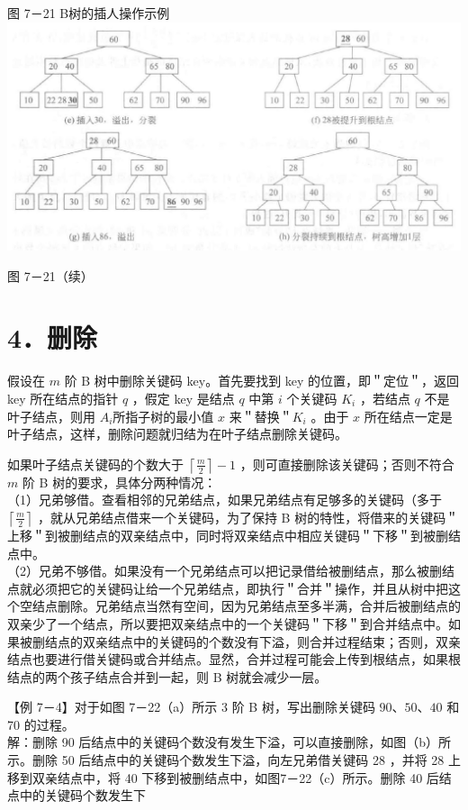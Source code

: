 \documentclass[10pt]{article}
\begin{document}
图 7－21 B树的插人操作示例\\
\includegraphics[max width=\textwidth, center]{2025_06_06_704745ea57b15b2333e5g-251}

图 7－21（续）

\section*{4．删除}
假设在 $m$ 阶 B 树中删除关键码 key。首先要找到 key 的位置，即＂定位＂，返回 key 所在结点的指针 $q$ ，假定 key 是结点 $q$ 中第 $i$ 个关键码 $K_{i}$ ，若结点 $q$ 不是叶子结点，则用 $A_{i}$所指子树的最小值 $x$ 来＂替换＂$K_{i}$ 。由于 $x$ 所在结点一定是叶子结点，这样，删除问题就归结为在叶子结点删除关键码。

如果叶子结点关键码的个数大于 $\left\lceil\frac{m}{2}\right\rceil-1$ ，则可直接删除该关键码；否则不符合 $m$ 阶 B 树的要求，具体分两种情况：\\
（1）兄弟够借。查看相邻的兄弟结点，如果兄弟结点有足够多的关键码（多于 $\left\lceil\frac{m}{2}\right\rceil$ ，就从兄弟结点借来一个关键码，为了保持 B 树的特性，将借来的关键码＂上移＂到被删结点的双亲结点中，同时将双亲结点中相应关键码＂下移＂到被删结点中。\\
（2）兄弟不够借。如果没有一个兄弟结点可以把记录借给被删结点，那么被删结点就必须把它的关键码让给一个兄弟结点，即执行＂合并＂操作，并且从树中把这个空结点删除。兄弟结点当然有空间，因为兄弟结点至多半满，合并后被删结点的双亲少了一个结点，所以要把双亲结点中的一个关键码＂下移＂到合并结点中。如果被删结点的双亲结点中的关键码的个数没有下溢，则合并过程结束；否则，双亲结点也要进行借关键码或合并结点。显然，合并过程可能会上传到根结点，如果根结点的两个孩子结点合并到一起，则 B 树就会减少一层。

【例 7－4】对于如图 7－22（a）所示 3 阶 B 树，写出删除关键码 $90 、 50 、 40$ 和 70 的过程。\\
解：删除 90 后结点中的关键码个数没有发生下溢，可以直接删除，如图（b）所示。删除 50 后结点中的关键码个数发生下溢，向左兄弟借关键码 28 ，并将 28 上移到双亲结点中，将 40 下移到被删结点中，如图7－22（c）所示。删除 40 后结点中的关键码个数发生下
\end{document}
